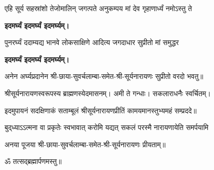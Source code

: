 \begin{center}
\twolineshloka
{एहि सूर्य सहस्रांशो तेजोमालिन् जगत्पते}
{अनुकम्पय मां देव गृहाणार्ध्यं नमोऽस्तु ते}

\textbf{\devAya{} इदमर्घ्यं इदमर्घ्यं इदमर्घ्यम्।}

\twolineshloka
{पुनरर्घ्यं ददाम्यद्य भानवे लोकसाक्षिणे}
{आदित्य जगदाधार सुप्रीतो मां समुद्धर}

\textbf{\devAya{} इदमर्घ्यं इदमर्घ्यं इदमर्घ्यम्।}

अनेन अर्घ्यप्रदानेन श्री-छाया-सुवर्चलाम्बा-समेत-श्री-सूर्यनारायणः सुप्रीतो वरदो भवतु॥

श्रीसूर्यनारायणस्वरूपस्य ब्राह्मणस्येदमासनम्। अमी ते गन्धाः। सकलाराधनैः स्वर्चितम्।

\hiranyagarbha

इदमुपायनं सदक्षिणाकं सताम्बूलं श्रीसूर्यनारायणप्रीतिं कामयमानस्तुभ्यमहं सम्प्रददे॥


{बुद्‌ध्याऽऽत्मना वा प्रकृतेः स्वभावात्}
{करोमि यद्यत् सकलं परस्मै}
{नारायणायेति समर्पयामि}

अनया पूजया श्री-छाया-सुवर्चलाम्बा-समेत-श्री-सूर्यनारायणः प्रीयताम्॥

ॐ तत्सद्ब्रह्मार्पणमस्तु॥

\closesub

\begingroup
\let\chapt\sect
\begin{center}
    
    
\end{center}
\endgroup

\end{center}

\closesection
